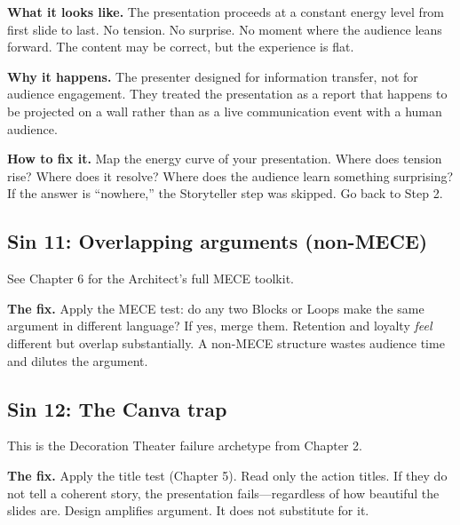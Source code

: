 \textbf{What it looks like.} The presentation proceeds at a constant energy level from first slide to last. No tension. No surprise. No moment where the audience leans forward. The content may be correct, but the experience is flat.

\textbf{Why it happens.} The presenter designed for information transfer, not for audience engagement. They treated the presentation as a report that happens to be projected on a wall rather than as a live communication event with a human audience.

\textbf{How to fix it.} Map the energy curve of your presentation. Where does tension rise? Where does it resolve? Where does the audience learn something surprising? If the answer is ``nowhere,'' the Storyteller step was skipped. Go back to Step 2.


\subsection{Sin 11: Overlapping arguments (non-MECE)}

See Chapter 6 for the Architect's full MECE toolkit.

\textbf{The fix.} Apply the MECE test: do any two Blocks or Loops make the same argument in different language? If yes, merge them. Retention and loyalty \emph{feel} different but overlap substantially. A non-MECE structure wastes audience time and dilutes the argument.


\subsection{Sin 12: The Canva trap}

This is the Decoration Theater failure archetype from Chapter 2.

\textbf{The fix.} Apply the title test (Chapter 5). Read only the action titles. If they do not tell a coherent story, the presentation fails---regardless of how beautiful the slides are. Design amplifies argument. It does not substitute for it.

